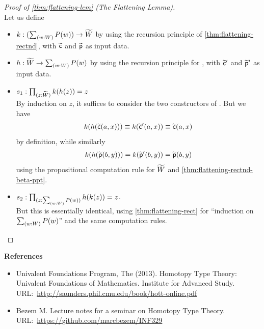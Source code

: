 \documentclass[centering]{report}
\newenvironment{slide}
    {\newpage
    \vspace*{\fill}
    }
    { 
     \vspace*{\fill}
    }
\begin{document}
\begin{slide}
\begin{proof}[Proof of \cref{thm:flattening-lem} (The Flattening Lemma)]
\hspace*{5cm}\\
Let us define
\begin{itemize}
    \item $k:(\sm{w:W}P(w)) \to \Wtil$ by using the recursion
    principle of \cref{thm:flattening-rectnd}, with $\widetilde{\mathsf{c}}$ and
    $\widetilde{\mathsf{p}}$ as input data.
   
    \item $h:\Wtil \to \sm{w:W}P(w)$ by using the recursion principle
    for \Wtil, with $\widetilde{\mathsf{c}}'$ and $\widetilde{\mathsf{p}}'$ as input data.
\vspace*{\fill}
\newpage
\vspace*{\fill}
    \item $s_1 : \prd{z : \Wtil} k(h(z)) = z$\\
    By induction on $z$, it suffices to consider the two constructors of \Wtil.
  But we have
  \begin{align*}
    k(h(\widetilde{\mathsf{c}}(a,x))) \equiv k(\widetilde{\mathsf{c}}'(a,x)) \equiv \widetilde{\mathsf{c}}(a,x)
  \end{align*}
  by definition, while similarly
  \begin{align*}
  {k}\mathopen{}\left({{h}\mathopen{}\left({\widetilde{\mathsf{p}}(b,y)}\right)\mathclose{}}\right)\mathclose{} = {k}\mathopen{}\left({\widetilde{\mathsf{p}}'(b,y)}\right)\mathclose{} = \widetilde{\mathsf{p}}(b,y)
  \end{align*}
  using the propositional computation rule for $\widetilde{W}$ and \cref{thm:flattening-rectnd-beta-ppt}.
  
  \item  $s_2 : \prd{z : \sm{w:W}P(w)} h(k(z)) = z$.\\
  But this is essentially identical, using \cref{thm:flattening-rect}
  for ``induction on $\sm{w:W}P(w)$'' and the same computation rules.
  \end{itemize}
\end{proof}
\end{slide}

\begin{slide}
\textbf{\color{darkred} References}
\begin{itemize}
\item Univalent Foundations Program, The (2013). Homotopy Type Theory:
Univalent Foundations of Mathematics. Institute for Advanced Study.\\ URL:~\url{http://saunders.phil.cmu.edu/book/hott-online.pdf}
\item Bezem M. Lecture notes for a seminar on Homotopy Type Theory.
URL:~\url{https://github.com/marcbezem/INF329}
\end{itemize}
\end{slide}
\end{document}
